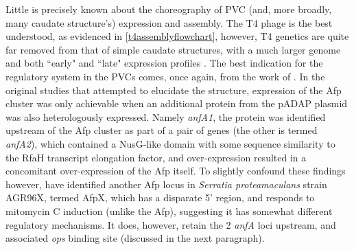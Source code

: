 Little is precisely known about the choreography of PVC (and, more broadly, many caudate structure's) expression and assembly. The T4 phage is the best understood, as evidenced in \vref{t4assemblyflowchart}, however, T4 genetics are quite far removed from that of simple caudate structures, with a much larger genome and both ``early" and ``late" expression profiles \citep{OFarrell1973}. The best indication for the regulatory system in the PVCs comes, once again, from the work of \cite{Hurst2007a, Hurst2004}. In the original studies that attempted to elucidate the structure, expression of the Afp cluster was only achievable when an additional protein from the pADAP plasmid was also heterologously expressed. Namely \emph{anfA1}, the protein was identified upstream of the Afp cluster as part of a pair of genes (the other is termed \emph{anfA2}), which contained a NusG-like domain with some sequence similarity to the RfaH transcript elongation factor, and over-expression resulted in a concomitant over-expression of the Afp itself. To slightly confound these findings however, \cite{Hurst2018} have identified another Afp locus in \emph{Serratia proteamaculans} strain AGR96X, termed AfpX, which has a disparate 5' region, and responds to mitomycin C induction (unlike the Afp), suggesting it has somewhat different regulatory mechanisms. It does, however, retain the 2 \emph{anfA} loci upstream, and associated \emph{ops} binding site (discussed in the next paragraph).

